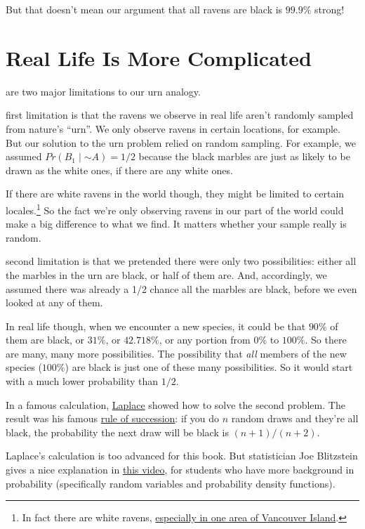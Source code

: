 \documentclass[justified]{tufte-book}
\newcommand{\given}{\mid}
\renewcommand{\neg}{\mathbin{\sim}}
\newcommand{\p}{Pr}
\theoremstyle{definition}
\theoremstyle{definition}
\theoremstyle{definition}
\theoremstyle{remark}
\begin{document}
But that doesn't mean our argument that all ravens are black is
\(99.9\%\) strong!

\hypertarget{real-life-is-more-complicated}{%
\section{Real Life Is More
Complicated}\label{real-life-is-more-complicated}}

 are two major limitations to our urn analogy.

 first limitation is that the ravens we observe in real
life aren't randomly sampled from nature's ``urn''. We only observe
ravens in certain locations, for example. But our solution to the urn
problem relied on random sampling. For example, we assumed
\(\p(B_1 \given \neg A) = 1/2\) because the black marbles are just as
likely to be drawn as the white ones, if there are any white ones.

If there are white ravens in the world though, they might be limited to
certain locales.\footnote{In fact there are white ravens,
  \href{https://vancouversun.com/news/local-news/rare-white-raven-spotted-on-vancouver-island}{especially
  in one area of Vancouver Island}.} So the fact we're only observing
ravens in our part of the world could make a big difference to what we
find. It matters whether your sample really is random.

 second limitation is that we pretended there were only
two possibilities: either all the marbles in the urn are black, or half
of them are. And, accordingly, we assumed there was already a 1/2 chance
all the marbles are black, before we even looked at any of them.

In real life though, when we encounter a new species, it could be that
\(90\%\) of them are black, or \(31\%\), or \(42.718\%\), or any portion
from \(0\%\) to \(100\%\). So there are many, many more possibilities.
The possibility that \emph{all} members of the new species (\(100\%\))
are black is just one of these many possibilities. So it would start
with a much lower probability than \(1/2\).

\begin{marginfigure}
In a famous calculation, \protect\hyperlink{fig:laplace}{Laplace} showed
how to solve the second problem. The result was his famous
\href{https://en.wikipedia.org/wiki/Rule_of_succession}{rule of
succession}: if you do \(n\) random draws and they're all black, the
probability the next draw will be black is \((n+1)/(n+2)\).

Laplace's calculation is too advanced for this book. But statistician
Joe Blitzstein gives a nice explanation in
\href{https://www.youtube.com/watch?v=N8O6zd6vTZ8\&list=EC2SOU6wwxB0uwwH80KTQ6ht66KWxbzTIo}{this
video}, for students who have more background in probability
(specifically random variables and probability density functions).
\end{marginfigure}
\end{document}
